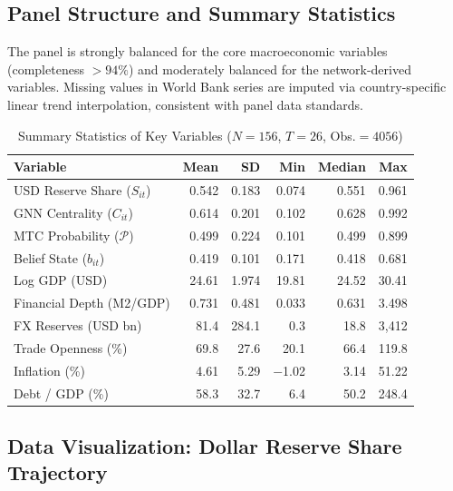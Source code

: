 \documentclass[12pt, letterpaper]{article}
\theoremstyle{definition}
\begin{document}
\subsection{Panel Structure and Summary Statistics}

The panel is strongly balanced for the core macroeconomic variables (completeness $> 94\%$) and moderately balanced for the network-derived variables. Missing values in World Bank series are imputed via country-specific linear trend interpolation, consistent with \citet{baltagi2013econometric} panel data standards.

\begin{table}[H]
\centering
\caption{Summary Statistics of Key Variables ($N=156$, $T=26$, Obs.$=4056$)}
\label{tab:summary}
\begin{tabular}{lrrrrr}
\toprule
\textbf{Variable} & \textbf{Mean} & \textbf{SD} & \textbf{Min} & \textbf{Median} & \textbf{Max} \\
\midrule
USD Reserve Share ($S_{it}$) & 0.542 & 0.183 & 0.074 & 0.551 & 0.961 \\
GNN Centrality ($C_{it}$) & 0.614 & 0.201 & 0.102 & 0.628 & 0.992 \\
MTC Probability ($\mathcal{P}$) & 0.499 & 0.224 & 0.101 & 0.499 & 0.899 \\
Belief State ($b_{it}$) & 0.419 & 0.101 & 0.171 & 0.418 & 0.681 \\
Log GDP (USD) & 24.61 & 1.974 & 19.81 & 24.52 & 30.41 \\
Financial Depth (M2/GDP) & 0.731 & 0.481 & 0.033 & 0.631 & 3.498 \\
FX Reserves (USD bn) & 81.4 & 284.1 & 0.3 & 18.8 & 3,412 \\
Trade Openness (\%) & 69.8 & 27.6 & 20.1 & 66.4 & 119.8 \\
Inflation (\%) & 4.61 & 5.29 & $-$1.02 & 3.14 & 51.22 \\
Debt / GDP (\%) & 58.3 & 32.7 & 6.4 & 50.2 & 248.4 \\
\bottomrule
\end{tabular}
\end{table}

\subsection{Data Visualization: Dollar Reserve Share Trajectory}
\end{document}
